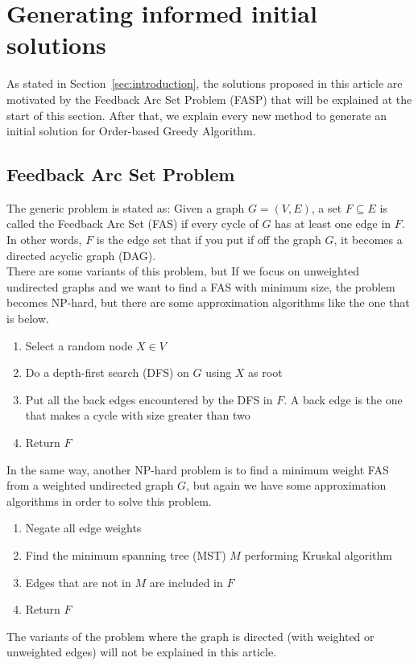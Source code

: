 \section{Generating informed initial solutions}
\label{sec:improve}

As stated in Section~\ref{sec:introduction}, the solutions proposed in this article are motivated by the Feedback Arc Set Problem (FASP) that will be explained at the start of this section. After that, we explain every new method to generate an initial solution for Order-based Greedy Algorithm.

\subsection{Feedback Arc Set Problem}
\label{subsec:fasp}

The generic problem is stated as: Given a graph $G = ( V , E )$, a set $F \subseteq E$ is called the Feedback Arc Set (FAS) if every cycle of $G$ has at least one edge in $F$. In other words, $F$ is the edge set that if you put if off the graph $G$, it becomes a directed acyclic graph (DAG).\\
There are some variants of this problem, but If we focus on unweighted undirected graphs and we want to find a FAS with minimum size, the problem becomes NP-hard, but there are some approximation algorithms like the one that is below.
\begin{enumerate}
	\item Select a random node $X \in V$
	\item Do a depth-first search (DFS) on $G$ using $X$ as root
	\item Put all the back edges encountered by the DFS in $F$. A back edge is the one that makes a cycle with size greater than two
	\item Return $F$
\end{enumerate}
In the same way, another NP-hard problem is to find a minimum weight FAS from a weighted undirected graph $G$, but again we have some approximation algorithms in order to solve this problem.
\begin{enumerate}
	\item Negate all edge weights
	\item Find the minimum spanning tree (MST) $M$ performing Kruskal algorithm
	\item Edges that are not in $M$ are included in $F$
	\item Return $F$
\end{enumerate}
The variants of the problem where the graph is directed (with weighted or unweighted edges) will not be explained in this article.

